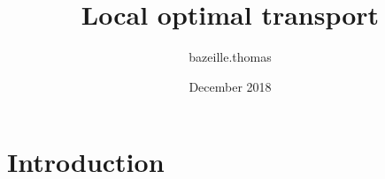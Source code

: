 \documentclass{article}
\title{Local optimal transport}
\author{bazeille.thomas }
\date{December 2018}
\begin{document}
\maketitle

\section{Introduction}
\end{document}
